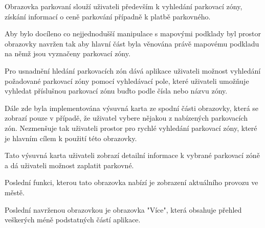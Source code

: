 \begin{minipage}[t]{0.45\textwidth}
Obrazovka parkovaní slouží uživateli především k vyhledání parkovací zóny, získání informací o ceně parkování případně k platbě parkovného.

Aby bylo docíleno co nejjednodušší manipulace s mapovými podklady byl prostor obrazovky navržen tak aby hlavní část byla věnována právě mapovému
podkladu na němž jsou vyznačeny parkovací zóny. 

Pro usnadnění hledání parkovacích zón dává aplikace uživateli možnost vyhledání požadované parkovací zóny pomocí vyhledávací pole, které 
uživateli umožňuje vyhledat příslušnou parkovací zónu buďto podle čísla nebo názvu zóny. 

Dále zde byla implementována výsuvná karta ze spodní části obrazovky, která se zobrazí pouze v případě, že uživatel vybere nějakou
z nabízených parkovacích zón. Nezmenšuje tak uživateli prostor pro rychlé vyhledání parkovací zóny, které je hlavním cílem k použití této obrazovky. 

Tato výsuvná karta uživateli zobrazí detailní informace k vybrané parkovací zóně a dá uživateli možnost zaplatit parkovné.

Poslední funkci, kterou tato obrazovka nabízí je zobrazení aktuálního provozu ve městě. 


\bigskip
{}
Poslední navrženou obrazovkou je obrazovka "Více", která obsahuje přehled veškerých méně podstatných částí aplikace.







\end{minipage}
\hfill
